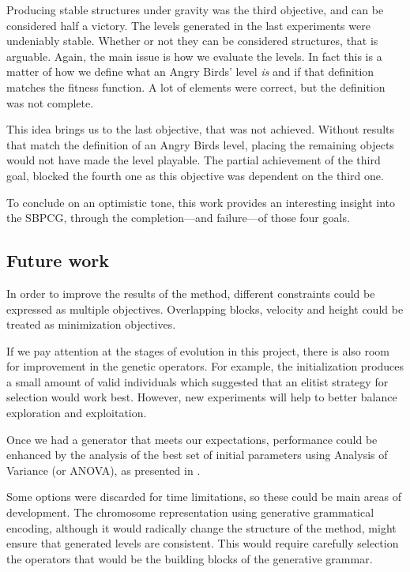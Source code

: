 \documentclass[runningheads,a4paper]{llncs}
\begin{document}
Producing stable structures under gravity was the third objective, and can be 
considered half a victory. The levels generated in the last experiments were 
undeniably stable. Whether or not they can be considered structures, that is 
arguable. Again, the main issue is how we evaluate the levels. In fact this is 
a matter of how we define what an Angry Birds' level \textit{is} and if that 
definition matches the fitness function. A lot of elements were correct, but 
the definition was not complete.

This idea brings us to the last objective, that was not achieved. Without 
results that match the definition of an Angry Birds level, placing the 
remaining objects would not have made the level playable. The partial 
achievement of the third goal, blocked the fourth one as this objective was 
dependent on the third one.

To conclude on an optimistic tone, this work provides an interesting insight 
into the SBPCG, through the completion---and failure---of those four goals.

\subsection{Future work}

In order to improve the results of the method, different constraints could be 
expressed as multiple objectives. Overlapping blocks, velocity and height could 
be treated as minimization objectives.

If we pay attention at the stages of evolution in this project, there is also 
room for improvement in the genetic operators. For example, the initialization 
produces a small amount of valid individuals which suggested that an elitist 
strategy for selection would work best. However, new experiments will help to 
better balance exploration and exploitation. 

Once we had a generator that meets our expectations, performance could be 
enhanced by the analysis of the best set of initial parameters using Analysis 
of Variance (or ANOVA), as presented in \cite{estevez2017statistical}. 

Some options were discarded for time limitations, so these could be main areas 
of development. The chromosome representation using generative grammatical 
encoding\cite{hornby2001advantages}, although it would radically change the 
structure of the method, might ensure that generated levels are consistent. 
This would require carefully selection the operators that would be the building 
blocks of the generative grammar.
\end{document}
